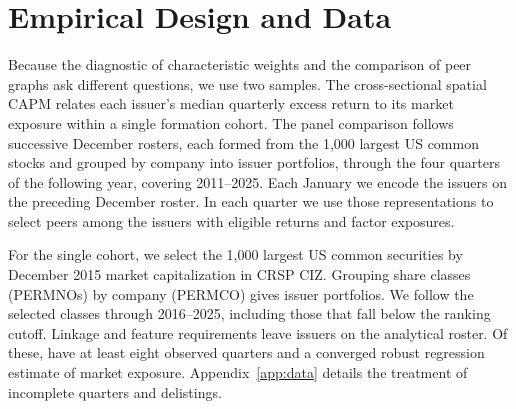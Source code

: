 \section{Empirical Design and Data}

\begin{table}[t]
  \centering
  \fftabletype
  \caption{Baseline LL is the total factor-only log likelihood. The next
    two columns give gains over that baseline in nats per issuer-quarter.
    The final column compares the two peer graphs in the same units.
    Brackets give 95\% intervals from resampling paired quarterly
  contributions at the fitted loadings and parameters.}
  \label{tab:matched-factors}
\end{table}

\begin{table}[t]
  \centering
  \fftabletype
  \caption{Market-controlled gain in fit of each encoder graph over the
    direct graph built from the same inputs, in nats per issuer-quarter.
    Columns give the ratio, underlying and broad input sets. Brackets give
    a conditional 95\% interval for each comparison. All graphs use
  symmetrized ten-neighbour weights.}
  \label{tab:matched-encoders}
\end{table}

Because the diagnostic of characteristic weights and the comparison of
peer graphs ask different questions, we use two samples. The
cross-sectional spatial CAPM relates each
issuer's median quarterly excess return to its market exposure within a
single formation cohort. The panel comparison follows successive December
rosters, each formed from the 1,000 largest US common stocks and grouped by
company into issuer portfolios, through the four quarters of the following
year, covering 2011--2025. Each January we encode the issuers on the
preceding December
roster. In each quarter we use those representations to select peers
among the issuers with eligible returns and factor exposures.

For the single cohort, we select the 1,000 largest US common securities
by December 2015 market capitalization in CRSP CIZ. Grouping share classes
(PERMNOs) by company (PERMCO) gives
 issuer portfolios.
We follow the selected classes through 2016--2025, including those that
fall below the ranking cutoff. Linkage and feature requirements leave
 issuers on the analytical roster.
Of these,  have at least eight
observed quarters and a converged robust regression estimate of market
exposure. Appendix~\ref{app:data} details the treatment of incomplete
quarters and delistings.

